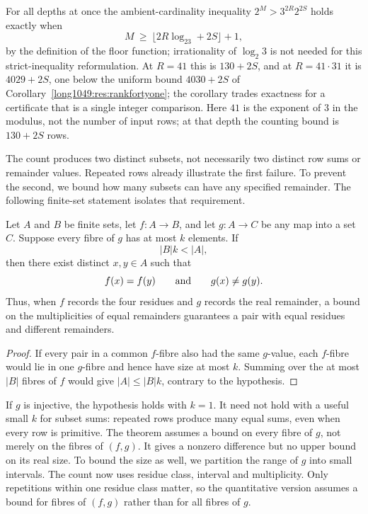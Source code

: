 \documentclass[11pt]{article}
\begin{document}
For all depths at once the ambient-cardinality inequality $2^{M}>3^{2R}2^{2S}$
holds exactly when
\[
 M\ \ge\ \bigl\lfloor2R\log_23+2S\bigr\rfloor+1,
\]
by the definition of the floor function; irrationality of $\log_2 3$
is not needed for this strict-inequality reformulation.
At $R=41$ this is $130+2S$, and
at $R=41\cdot31$ it is $4029+2S$, one below the uniform bound $4030+2S$ of
Corollary~\ref{long1049:res:rankfortyone}; the corollary trades exactness for a
certificate that is a single integer comparison.  Here $41$ is the exponent of $3$ in the modulus, not the number of
input rows; at that depth the counting bound is $130+2S$ rows.

The count produces two distinct subsets, not necessarily two
distinct row sums or remainder values. Repeated rows already
illustrate the first failure. To prevent the second, we bound how
many subsets can have any specified remainder. The following
finite-set statement isolates that requirement.

\begin{theorem}\label{long1049:res:boundedfibre}
Let $A$ and $B$ be finite sets, let $f:A\to B$, and let $g:A\to C$ be any
map into a set $C$.  Suppose every fibre of $g$ has at most $k$ elements.  If
\[
 |B|k<|A|,
\]
then there exist distinct $x,y\in A$ such that
\[
 f(x)=f(y)\qquad\hbox{and}\qquad g(x)\ne g(y).
\]
Thus, when $f$ records the four residues and $g$ records the real
remainder, a bound on the multiplicities of equal remainders guarantees
a pair with equal residues and different remainders.
\end{theorem}

\begin{proof}
If every pair in a common $f$-fibre also had the same $g$-value, each
$f$-fibre would lie in one $g$-fibre and hence have size at most $k$.
Summing over the at most $|B|$ fibres of $f$ would give
$|A|\le |B|k$, contrary to the hypothesis.
\end{proof}

If $g$ is injective, the hypothesis holds with $k=1$. It need not hold
with a useful small $k$ for subset sums: repeated rows produce
many equal sums, even when every row is primitive. The theorem assumes
a bound on every fibre of $g$, not merely on the fibres of $(f,g)$.
It gives a nonzero difference but no upper bound on its real size.
To bound the size as well, we partition the range of $g$ into small
intervals. The count now uses residue class, interval and multiplicity.
Only repetitions within one residue class matter, so the quantitative
version assumes a bound for fibres of $(f,g)$ rather than for all
fibres of $g$.
\end{document}
